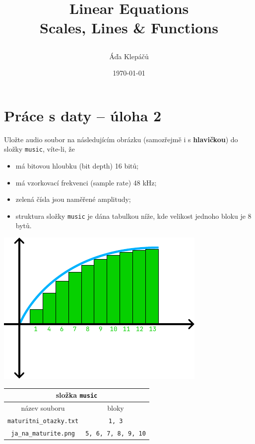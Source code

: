 \documentclass[a4paper,12pt]{article}
\title{\Huge\textsf{Linear Equations}\\
 \Large\textsf{Scales, Lines \& Functions}
 \author{Áďa Klepáčů}
 \date{\today}
}
\begin{document}
\thispagestyle{fancy}

\section*{Práce s daty -- úloha 2}

Uložte audio soubor na následujícím obrázku (samozřejmě i s \textbf{hlavičkou})
do složky \texttt{music}, víte-li, že
\begin{itemize}[topsep=0pt]
 \item má bitovou hloubku (bit depth) 16 bitů;
 \item má vzorkovací frekvenci (sample rate) 48 kHz;
 \item zelená čísla jsou naměřené amplitudy;
 \item struktura složky \texttt{music} je dána tabulkou níže, kde velikost
  jednoho bloku je 8 bytů.
\end{itemize}
\begin{center}
 \includegraphics[width=.5\textwidth]{amplitude.pdf}
\end{center}
\begin{center}
 \begin{tabular}{c|c}
  \multicolumn{2}{c}{složka \texttt{music}} \\
  \toprule
  název souboru & bloky \\
  \midrule
  \texttt{maturitni\_otazky.txt} & \texttt{1, 3} \\
  \texttt{ja\_na\_maturite.png} & \texttt{5, 6, 7, 8, 9, 10}
 \end{tabular}
\end{center}
 
\end{document}
